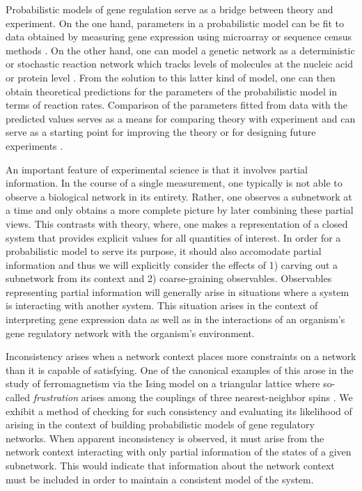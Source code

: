 Probabilistic models of gene regulation serve as a bridge between theory and experiment.  On the one hand, parameters in a probabilistic model can be fit to data obtained by measuring gene expression using microarray or sequence census methods \cite{Friedman2008a,Zhang2013}.  On the other hand, one can model a genetic network as a deterministic or stochastic reaction network which tracks levels of molecules at the nucleic acid or protein level \cite{Alon2006,Voit2012}.  From the solution to this latter kind of model, one can then obtain theoretical predictions for the parameters of the probabilistic model in terms of reaction rates.  Comparison of the parameters fitted from data with the predicted values serves as a means for comparing theory with experiment and can serve as a starting point for improving the theory or for designing future experiments \cite{Tonsing2014}.

An important feature of experimental science is that it involves partial information.  In the course of a single measurement, one typically is not able to observe a biological network in its entirety.  Rather, one observes a subnetwork at a time and only obtains a more complete picture by later combining these partial views.  This contrasts with theory, where, one makes a representation of a closed system that provides explicit values for all quantities of interest.  In order for a probabilistic model to serve its purpose, it should also accomodate partial information and thus we will explicitly consider the effects of 1) carving out a subnetwork from its context and 2) coarse-graining observables. Observables representing partial information will generally arise in situations where a system is interacting with another system. This situation arises in the context of interpreting gene expression data as well as in the interactions of an organism's gene regulatory network with the organism's environment.


Inconsistency arises when a network context places more constraints on a network than it is capable of satisfying. One of the canonical examples of this arose in the study of ferromagnetism via the Ising model on a triangular lattice where so-called \emph{frustration} arises among the couplings of three nearest-neighbor spins \cite{Wannier1950,Toulouse1977,Vannimenus1977}. We exhibit a method of checking for such consistency and evaluating its likelihood of arising in the context of building probabilistic models of gene regulatory networks. When apparent inconsistency is observed, it must arise from the network context interacting with only partial information of the states of a given subnetwork. This would indicate that information about the network context must be included in order to maintain a consistent model of the system.

